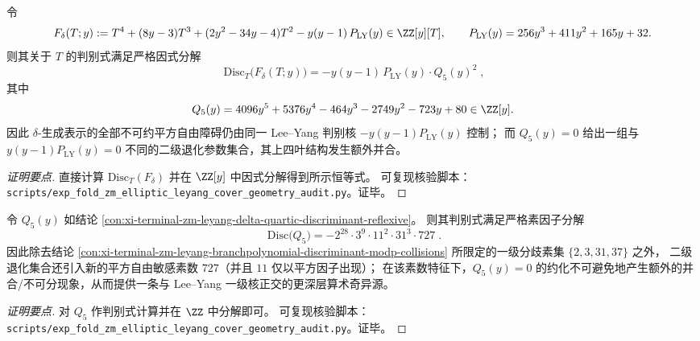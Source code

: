 \begin{conclusion}\label{con:xi-terminal-zm-leyang-delta-quartic-discriminant-reflexive}
令
\[
F_\delta(T;y):=T^{4}+(8y-3)T^{3}+(2y^{2}-34y-4)T^{2}-y(y-1)\,P_{\mathrm{LY}}(y)\in\ZZ[y][T],
\qquad
P_{\mathrm{LY}}(y)=256y^{3}+411y^{2}+165y+32.
\]
则其关于 \(T\) 的判别式满足严格因式分解
\[
\boxed{\;
\mathrm{Disc}_{T}\bigl(F_\delta(T;y)\bigr)
=-y(y-1)\,P_{\mathrm{LY}}(y)\cdot Q_{5}(y)^{2}\;},
\]
其中
\[
Q_{5}(y)=4096y^{5}+5376y^{4}-464y^{3}-2749y^{2}-723y+80\in\ZZ[y].
\]
因此 \(\delta\)-生成表示的全部不可约平方自由障碍仍由同一 Lee--Yang 判别核 \(-y(y-1)P_{\mathrm{LY}}(y)\) 控制；
而 \(Q_{5}(y)=0\) 给出一组与 \(y(y-1)P_{\mathrm{LY}}(y)=0\) 不同的二级退化参数集合，其上四叶结构发生额外并合。
\end{conclusion}
\begin{proof}[证明要点]
直接计算 \(\mathrm{Disc}_{T}(F_\delta)\) 并在 \(\ZZ[y]\) 中因式分解得到所示恒等式。
可复现核验脚本：\texttt{scripts/exp\_fold\_zm\_elliptic\_leyang\_cover\_geometry\_audit.py}。证毕。
\end{proof}






\begin{conclusion}\label{con:xi-terminal-zm-leyang-q5-discriminant-727}
令 \(Q_5(y)\) 如结论 \ref{con:xi-terminal-zm-leyang-delta-quartic-discriminant-reflexive}。
则其判别式满足严格素因子分解
\[
\boxed{\;
\mathrm{Disc}\bigl(Q_5\bigr)=-2^{28}\cdot 3^{9}\cdot 11^{2}\cdot 31^{3}\cdot 727\; }.
\]
因此除去结论 \ref{con:xi-terminal-zm-leyang-branchpolynomial-discriminant-modp-collisions} 所限定的一级分歧素集 \(\{2,3,31,37\}\) 之外，
二级退化集合还引入新的平方自由敏感素数 \(727\)（并且 \(11\) 仅以平方因子出现）；
在该素数特征下，\(Q_5(y)=0\) 的约化不可避免地产生额外的并合/不可分现象，从而提供一条与 Lee--Yang 一级核正交的更深层算术奇异源。
\end{conclusion}
\begin{proof}[证明要点]
对 \(Q_5\) 作判别式计算并在 \(\ZZ\) 中分解即可。
可复现核验脚本：\texttt{scripts/exp\_fold\_zm\_elliptic\_leyang\_cover\_geometry\_audit.py}。证毕。
\end{proof}

